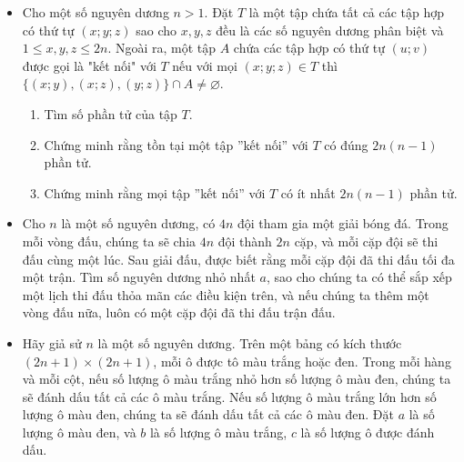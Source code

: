 \documentclass[11pt]{scrartcl}
\begin{document}
\begin{itemize}[label=, leftmargin=0em, itemsep=-0em]
    \item \begin{btvn}
        Cho một số nguyên dương $n>1$. Đặt $T$ là một tập chứa tất cả các tập hợp có thứ tự $(x;y;z)$ sao cho $x,y,z$ đều là các số nguyên dương phân biệt và $1\leq x,y,z\leq 2n$. Ngoài ra, một tập $A$ chứa các tập hợp có thứ tự $(u;v)$ được gọi là "kết nối" với $T$ nếu với mọi $(x;y;z)\in T$ thì $\{(x;y),(x;z),(y;z)\} \cap A \neq \varnothing$.
        \begin{enumerate}[label=(\alph*)]
            \item Tìm số phần tử của tập $T$.
            \item Chứng minh rằng tồn tại một tập ''kết nối'' với $T$ có đúng $2n(n-1)$ phần tử.
            \item Chứng minh rằng mọi tập ''kết nối'' với $T$ có ít nhất $2n(n-1)$ phần tử.
        \end{enumerate}

    \end{btvn}

    \item \begin{btvn}
    Cho $n$ là một số nguyên dương, có $4n$ đội tham gia một giải bóng đá. Trong mỗi vòng đấu, chúng ta sẽ chia $4n$ đội thành $2n$ cặp, và mỗi cặp đội sẽ thi đấu cùng một lúc. Sau giải đấu, được biết rằng mỗi cặp đội đã thi đấu tối đa một trận. Tìm số nguyên dương nhỏ nhất $a$, sao cho chúng ta có thể sắp xếp một lịch thi đấu thỏa mãn các điều kiện trên, và nếu chúng ta thêm một vòng đấu nữa, luôn có một cặp đội đã thi đấu trận đấu.
    \end{btvn}

    \item \begin{btvn} Hãy giả sử $n$ là một số nguyên dương. Trên một bảng có kích thước $(2n+1)\times (2n+1)$, mỗi ô được tô màu trắng hoặc đen. Trong mỗi hàng và mỗi cột, nếu số lượng ô màu trắng nhỏ hơn số lượng ô màu đen, chúng ta sẽ đánh dấu tất cả các ô màu trắng. Nếu số lượng ô màu trắng lớn hơn số lượng ô màu đen, chúng ta sẽ đánh dấu tất cả các ô màu đen. Đặt $a$ là số lượng ô màu đen, và $b$ là số lượng ô màu trắng, $c$ là số lượng ô được đánh dấu.


\end{btvn}
\end{itemize}
\end{document}
